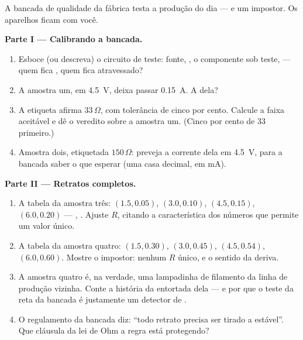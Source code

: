 \begin{problem}\label{pb:g8:ohms-law:1}
A bancada de qualidade da fábrica testa a produção do dia --- e um
impostor. Os aparelhos ficam com você.

\medskip\noindent\textbf{Parte I --- Calibrando a bancada.}
\begin{enumerate}
  \item Esboce (ou descreva) o circuito de teste: fonte, ,
        o componente sob teste,  --- quem fica ,
        quem fica atravessado?
  \item A amostra um, em \qty{4.5}{V}, deixa passar \qty{0.15}{A}. A
         dela?
  \item A etiqueta afirma $33\,\Omega$, com tolerância de cinco por
        cento. Calcule a faixa aceitável e dê o veredito sobre a
        amostra um. (Cinco por cento de $33$ primeiro.)
  \item Amostra dois, etiquetada $150\,\Omega$: preveja a corrente
        dela em \qty{4.5}{V}, para a bancada saber o que esperar (uma
        casa decimal, em \unit{mA}).
\end{enumerate}

\medskip\noindent\textbf{Parte II --- Retratos completos.}
\begin{enumerate}[resume]
  \item A tabela da amostra três: $(1.5, 0.05)$, $(3.0, 0.10)$,
        $(4.5, 0.15)$, $(6.0, 0.20)$ --- , . Ajuste $R$,
        citando a característica dos números que permite um valor
        único.
  \item A tabela da amostra quatro: $(1.5, 0.30)$, $(3.0, 0.45)$,
        $(4.5, 0.54)$, $(6.0, 0.60)$. Mostre o impostor: nenhum $R$
        único, e o sentido da deriva.
  \item A amostra quatro é, na verdade, uma lampadinha de filamento
        da linha de produção vizinha. Conte a história da entortada
        dela --- e por que o teste da reta da bancada é justamente um
        detector de .
  \item O regulamento da bancada diz: ``todo retrato precisa ser
        tirado a  estável''. Que cláusula da lei de Ohm a
        regra está protegendo?
\end{enumerate}


\end{problem}
